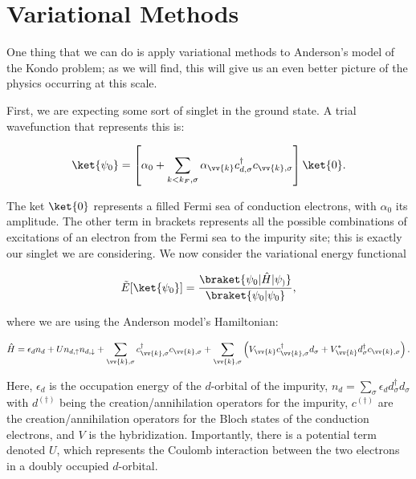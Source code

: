 \section{Variational Methods}\label{sec:3-variational}

One thing that we can do is apply variational methods to Anderson's model of the Kondo problem; as we will find, this will give us an even better picture of the physics occurring at this scale.

First, we are expecting some sort of singlet in the ground state. A trial wavefunction that represents this is:

\begin{equation}
  \ket{\psi_0} = \left[ \alpha_0 + \sum_{k<k_F,\sigma}\alpha_{\vv{k}}c^\dagger_{d,\sigma}c_{\vv{k},\sigma} \right]\ket{0}.
\end{equation}

The ket $\ket{0}$ represents a filled Fermi sea of conduction electrons, with $\alpha_0$ its amplitude. The other term in brackets represents all the possible combinations of excitations of an electron from the Fermi sea to the impurity site; this is exactly our singlet we are considering. We now consider the variational energy functional

\begin{equation}
  \tilde{E}[\ket{\psi_0}] = \frac{\braket{\psi_0 | \hat{H} | \psi_)}}{\braket{\psi_0 | \psi_0}},
\end{equation}

where we are using the Anderson model's Hamiltonian:

\begin{equation}
  \hat{H} = \epsilon_d n_d + Un_{d,\uparrow}n_{d,\downarrow} + \sum_{\vv{k},\sigma}c^\dagger_{\vv{k},\sigma}c_{\vv{k},\sigma} + \sum_{\vv{k},\sigma}\left( V_{\vv{k}}c^\dagger_{\vv{k},\sigma}d_\sigma + V_{\vv{k}}^* d^\dagger_\sigma c_{\vv{k},\sigma} \right).
\end{equation}

Here, $\epsilon_d$ is the occupation energy of the $d$-orbital of the impurity, $n_d = \sum_\sigma \epsilon_d d^\dagger_\sigma d_\sigma$ with $d^{(\dagger)}$ being the creation/annihilation operators for the impurity, $c^{(\dagger)}$ are the creation/annihilation operators for the Bloch states of the conduction electrons, and $V$ is the hybridization. Importantly, there is a potential term denoted $U$, which represents the Coulomb interaction between the two electrons in a doubly occupied $d$-orbital.

